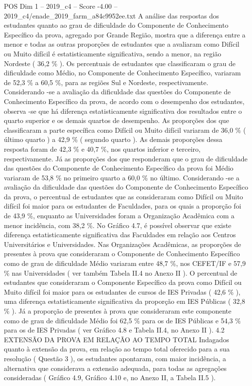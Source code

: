 \begin{textsample}{POS Dim 1 – 2019\_c4 – Score -4.00 – 2019\_c4/enade\_2019\_farm\_a84c9952ee.txt}
A análise das respostas dos estudantes quanto ao grau de dificuldade do Componente de Conhecimento Específico da prova, agregado por Grande Região, mostra que a diferença entre a menor e todas as outras proporções de estudantes que a avaliaram como Difícil ou Muito difícil é estatisticamente significativa, sendo a menor, na região Nordeste ( 36,2 \% ).
Os percentuais de estudantes que classificaram o grau de dificuldade como Médio, no Componente de Conhecimento Específico, variaram de 52,3 \% a 60,5 \%, para as regiões Sul e Nordeste, respectivamente.
Considerando -se a avaliação da dificuldade das questões do Componente de Conhecimento Específico da prova, de acordo com o desempenho dos estudantes, observa -se que há diferença estatisticamente significativa dos resultados entre o quarto superior e os demais quartos de desempenho.
As proporções dos que classificaram a parte específica como Difícil ou Muito difícil variaram de 36,0 \% ( último quarto ) a 42,9 \% ( segundo quarto ).
As demais proporções dessa resposta foram de 42,3 \% e 40,7 \%, nos quartos inferior e terceiro, respectivamente.
Já as proporções dos que responderam que o grau de dificuldade das questões do Componente de Conhecimento Específico da prova foi Médio variaram de 53,8 \% no primeiro quarto a 60,0 \% no último.
Considerando -se a avaliação da dificuldade das questões do Componente de Conhecimento Específico da prova, o percentual de estudantes que as consideraram como Difícil ou Muito difícil foi maior para os estudantes de Faculdades, para os quais a proporção foi de 43,9 \%, enquanto as Universidades foram a Organização Acadêmica com a menor incidência, com 38,2 \%.
No Gráfico 4.7, é possível observar que existe diferença estatisticamente significativa das Faculdades em relação aos Centros Universitários e Universidades.
Nas Organizações Acadêmicas, as proporções de presentes à prova que consideraram o Componente de Conhecimento Específico como de grau de dificuldade Médio variaram entre 48,7 \%, nos CEFET/IF e 57,9 \% nas Universidades ( ver também Tabela II.4 no Anexo II ).
O percentual de estudantes que consideraram o Componente Específico da prova como Difícil ou Muito difícil foi maior para os estudantes de cursos de IES Privadas ( 42,6 \% ), uma diferença estatisticamente significativa da proporção em IES Públicas ( 32,8 \% ).
Já a proporção de presentes à prova que consideraram este componente como de grau de dificuldade Médio foi 62,5 \% para os de IES Públicas e 54,3 \% para os de IES Privadas ( ver Gráfico 4.8 e Tabela II.4, no Anexo II ). 4.2 EXTENSÃO DA PROVA EM RELAÇÃO AO TEMPO TOTAL Indagados quanto à extensão da prova, em relação ao tempo total oferecido para a sua resolução ( Questão 3 ), os estudantes apontaram, com maior incidência, a alternativa que considerava a extensão adequada, para todas as agregações consideradas ( Gráfico 4.9, Gráfico 4.10 e, no Anexo II, a Tabela II.5 ).

\end{textsample}
